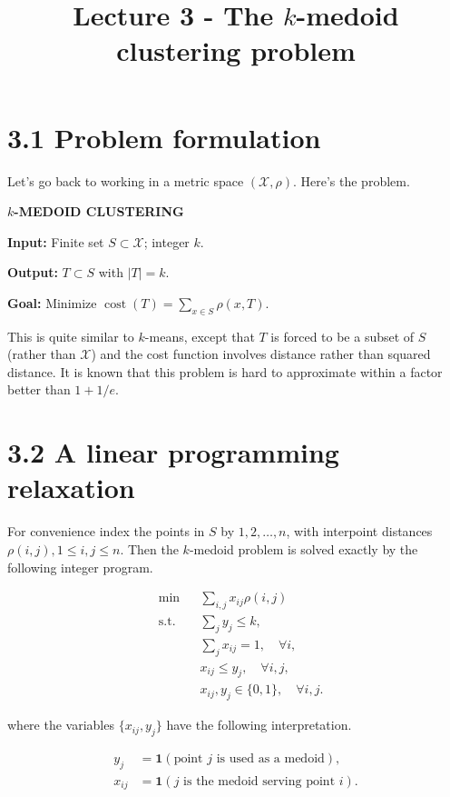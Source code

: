\documentclass{article}
\title{Lecture 3 - The $k$-medoid clustering problem}
\author{}
\date{}
\begin{document}
\maketitle

\section*{3.1 Problem formulation}

Let's go back to working in a metric space $(\mathcal{X}, \rho)$. Here's the problem.

\textbf{$k$-MEDOID CLUSTERING}

\textbf{Input:} Finite set $S \subset \mathcal{X}$; integer $k$.

\textbf{Output:} $T \subset S$ with $|T| = k$.

\textbf{Goal:} Minimize $\operatorname{cost}(T) = \sum_{x \in S} \rho(x, T)$.

This is quite similar to $k$-means, except that $T$ is forced to be a subset of $S$ (rather than $\mathcal{X}$) and the cost function involves distance rather than squared distance. It is known that this problem is hard to approximate within a factor better than $1 + 1/e$.

\section*{3.2 A linear programming relaxation}

For convenience index the points in $S$ by $1, 2, \ldots, n$, with interpoint distances $\rho(i, j), 1 \leq i, j \leq n$. Then the $k$-medoid problem is solved exactly by the following integer program.

\begin{equation*}
\begin{aligned}
&\min && \sum_{i, j} x_{i j} \rho(i, j) \\
&\text{s.t.} && \sum_{j} y_{j} \leq k, \\
&&& \sum_{j} x_{i j} = 1, \quad \forall i, \\
&&& x_{i j} \leq y_{j}, \quad \forall i, j, \\
&&& x_{i j}, y_{j} \in \{0, 1\}, \quad \forall i, j.
\end{aligned}
\end{equation*}

where the variables $\{x_{i j}, y_{j}\}$ have the following interpretation.

\begin{equation*}
\begin{aligned}
 y_{j} &= \mathbf{1}(\text{point } j \text{ is used as a medoid}), \\
 x_{i j} &= \mathbf{1}(j \text{ is the medoid serving point } i).
\end{aligned}
\end{equation*}
\end{document}
